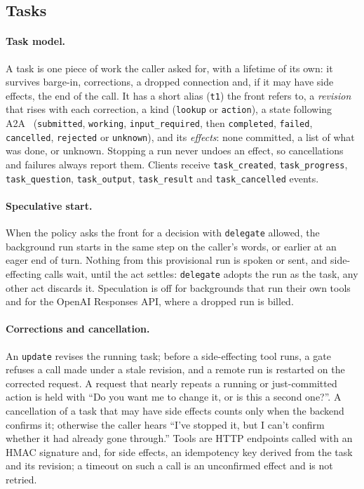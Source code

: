 \subsection{Tasks}\label{sec:sys-tasks}

\paragraph{Task model.}
A task is one piece of work the caller asked for, with a lifetime of its own: it survives barge-in, corrections, a dropped
connection and, if it may have side effects, the end of the call. It has a short alias (\texttt{t1}) the front refers to, a
\emph{revision} that rises with each correction, a kind (\texttt{lookup} or \texttt{action}), a state following
A2A~\citep{a2a_spec} (\texttt{submitted}, \texttt{working}, \texttt{input\_required}, then \texttt{completed},
\texttt{failed}, \texttt{cancelled}, \texttt{rejected} or \texttt{unknown}), and its \emph{effects}: none committed, a list
of what was done, or unknown. Stopping a run never undoes an effect, so cancellations and failures always report them.
Clients receive \texttt{task\_created}, \texttt{task\_progress}, \texttt{task\_question}, \texttt{task\_output},
\texttt{task\_result} and \texttt{task\_cancelled} events.

\paragraph{Speculative start.}
When the policy asks the front for a decision with \texttt{delegate} allowed, the background run starts in the same step on
the caller's words, or earlier at an eager end of turn. Nothing from this provisional run is spoken or sent, and
side-effecting calls wait, until the act settles: \texttt{delegate} adopts the run as the task, any other act discards it.
Speculation is off for backgrounds that run their own tools and for the OpenAI Responses API, where a dropped run is billed.

\paragraph{Corrections and cancellation.}
An \texttt{update} revises the running task; before a side-effecting tool runs, a gate refuses a call made under a stale
revision, and a remote run is restarted on the corrected request. A request that nearly repeats a running or just-committed
action is held with ``Do you want me to change it, or is this a second one?''. A cancellation of a task that may have side
effects counts only when the backend confirms it; otherwise the caller hears ``I've stopped it, but I can't confirm whether it
had already gone through.'' Tools are HTTP endpoints called with an HMAC signature and, for side effects, an idempotency key
derived from the task and its revision; a timeout on such a call is an unconfirmed effect and is not retried.

